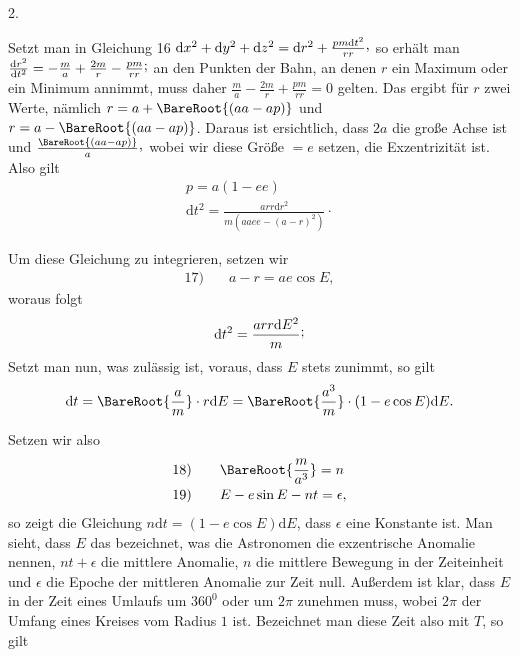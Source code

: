 \par{}\bigskip
{}
\begin{center}2.\end{center}
\noindent\hspace*{\parindent}Setzt man in Gleichung 16 \(\mathrm{d}x^2+\mathrm{d}y^2+\mathrm{d}z^2=\mathrm{d}r^2+\frac{pm\mathrm{d}t^2}{rr}\mathpunct{\raisebox{.45ex}{,}}\) so erhält man \(\frac{\mathrm{d}r^2}{\mathrm{d}t^2}=-\frac{m}{a}+\frac{2m}{r}-\frac{pm}{rr}\mathpunct{\raisebox{.45ex}{;}}\) an den Punkten der Bahn, an denen \(r\) ein Maximum oder ein Minimum annimmt, muss daher \(\frac{m}{a}-\frac{2m}{r}+\frac{pm}{rr}=0\) gelten. Das ergibt für \(r\) zwei Werte, nämlich \(r=a+\BareRoot{(aa-ap)}\) und \(r=a-\BareRoot{(aa-ap)}\). Daraus ist ersichtlich, dass \(2a\) die große Achse ist und \(\frac{\BareRoot{(aa-ap)}}{a}\mathpunct{\raisebox{.45ex}{,}}\) wobei wir diese Größe \(=e\) setzen, die Exzentrizität ist. Also gilt
\[
\begin{gathered}
p=a(1-ee)\\[4pt]
\mathrm{d}t^2=\frac{arr\mathrm{d}r^2}{m(aaee-(a-r)^2)}\mathpunct{\cdot}
\end{gathered}
\]
\par Um diese Gleichung zu integrieren, setzen wir
\[
\begin{array}{rl}17)\quad&a-r=ae\cos E,\end{array}
\]
woraus folgt
\[
\mathrm{d}t^2=\frac{arr\mathrm{d}E^2}{m}\mathpunct{\raisebox{.45ex}{;}}
\]
Setzt man nun, was zulässig ist, voraus, dass \(E\) stets zunimmt, so gilt
\[
\mathrm{d}t=\BareRoot{\frac{a}{m}}\cdot r\mathrm{d}E=\BareRoot{\frac{a^3}{m}}\cdot(1-e\cos E)\mathrm{d}E.
\]
\par Setzen wir also
\[
\begin{array}{rl}
18)\quad&\BareRoot{\dfrac{m}{a^3}}=n\\[6pt]
19)\quad&E-e\sin E-nt=\epsilon,
\end{array}
\]
so zeigt die Gleichung \(n\mathrm{d}t=(1-e\cos E)\mathrm{d}E\), dass \(\epsilon\) eine Konstante ist. Man sieht, dass \(E\) das bezeichnet, was die Astronomen die exzentrische Anomalie nennen, \(nt+\epsilon\) die mittlere Anomalie, \(n\) die mittlere Bewegung in der Zeiteinheit und \(\epsilon\) die Epoche der mittleren Anomalie zur Zeit null. Außerdem ist klar, dass \(E\) in der Zeit eines Umlaufs um \(360^{0}\) oder um \(2\pi\) zunehmen muss, wobei \(2\pi\) der Umfang eines Kreises vom Radius \(1\) ist. Bezeichnet man diese Zeit also mit \(T\), so gilt
